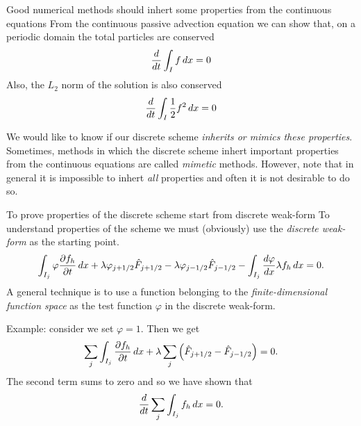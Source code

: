 \documentclass[pdf]{beamer}
\newcommand{\pfrac}[2]{\frac{\partial #1}{\partial #2}}
\newcommand{\mypause}{}
\theoremstyle{definition}
\begin{document}
\begin{frame}{Good numerical methods should inhert some properties
    from the continuous equations}
  From the continuous passive advection equation we can show that, on
  a periodic domain the total particles are conserved
  \begin{align*}
    \frac{d}{dt}\int_I f \thinspace dx = 0
  \end{align*}
  Also, the $L_2$ norm of the solution is also conserved
  \begin{align*}
    \frac{d}{dt}\int_I \frac{1}{2} f^2 \thinspace dx = 0
  \end{align*}  

  We would like to know if our discrete scheme \emph{inherits or
    mimics these properties}. Sometimes, methods in which the discrete
  scheme inhert important properties from the continuous equations are
  called \emph{mimetic} methods. However, note that in general it is
  impossible to inhert \emph{all} properties and often it is not
  desirable to do so.
  
\end{frame}


\begin{frame}{To prove properties of the discrete scheme start from
    discrete weak-form}
  \footnotesize
  To understand properties of the scheme we must (obviously) use the
  \emph{discrete weak-form} as the starting point.
  \begin{align*}
    \int_{I_j} \varphi \pfrac{f_h}{t}\thinspace dx
    +
    \lambda \varphi_{j+1/2}\hat{F}_{j+1/2} - \lambda \varphi_{j-1/2}\hat{F}_{j-1/2}
    -
    \int_{I_j}  \frac{d\varphi}{dx}\lambda f_h\thinspace dx = 0.
  \end{align*}
  A general technique is to use a function belonging to the
  \emph{finite-dimensional function space} as the test function
  $\varphi$ in the discrete weak-form.
  \mypause%

  Example: consider we set $\varphi = 1$. Then we get
  \begin{align*}
    \sum_j \int_{I_j} \pfrac{f_h}{t}\thinspace dx
    +
    \lambda \sum_j \left(
    \hat{F}_{j+1/2} - \hat{F}_{j-1/2}
    \right) = 0.
  \end{align*}
  The second term sums to zero and so we have shown that
  \begin{align*}
    \frac{d}{dt}\sum_j \int_{I_j} f_h\thinspace dx = 0.
  \end{align*}  
\end{frame}
\end{document}

